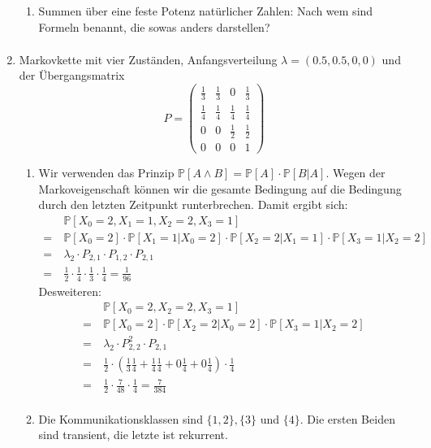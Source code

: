 \documentclass[a4paper,11pt,notitlepage,fullpage]{article}
\newcommand{\pp}[1]{\mathbb P\left[#1\right]}
\begin{document}
\begin{enumerate}
\begin{enumerate}
\item Summen über eine feste Potenz natürlicher Zahlen: Nach wem sind Formeln benannt, die sowas anders darstellen?
\begin{align*}
\end{align*}
\end{enumerate}

\item Markovkette mit vier Zuständen, Anfangsverteilung $\lambda = (0.5, 0.5, 0, 0)$ und der Übergangsmatrix
$$P=\begin{pmatrix}
\frac{1}{3} & \frac{1}{3} & 0 & \frac{1}{3} \\
\frac{1}{4} & \frac{1}{4} & \frac{1}{4} & \frac{1}{4} \\
0 & 0 & \frac{1}{2} & \frac{1}{2} \\
0 & 0 & 0 & 1
\end{pmatrix}$$
\begin{enumerate}
\item Wir verwenden das Prinzip $\pp{A \wedge B} = \pp{A} \cdot \pp{B|A}$. Wegen der Markoveigenschaft können wir die gesamte Bedingung auf die Bedingung durch den letzten Zeitpunkt runterbrechen. Damit ergibt sich:
\begin{align*}
&\pp{X_0 = 2, X_1 = 1, X_2 = 2, X_3 = 1} \\
=~&\pp{X_0 = 2} \cdot \pp{X_1 = 1 | X_0 = 2} \cdot \pp{X_2 = 2 | X_1 = 1} \cdot \pp{X_3 = 1 | X_2 = 2} \\
=~&\lambda_2 \cdot P_{2, 1} \cdot P_{1, 2} \cdot P_{2, 1} \\
=~&\frac{1}{2} \cdot \frac{1}{4} \cdot \frac{1}{3} \cdot \frac{1}{4} = \frac{1}{96}
\end{align*}
Desweiteren:
\begin{align*}
&\pp{X_0 = 2, X_2 = 2, X_3 = 1} \\
=~&\pp{X_0 = 2} \cdot \pp{X_2 = 2 | X_0 = 2} \cdot \pp{X_3 = 1 | X_2 = 2} \\
=~&\lambda_2 \cdot P^2_{2, 2} \cdot P_{2, 1} \\
=~&\frac{1}{2} \cdot (\frac{1}{3}\frac{1}{4} + \frac{1}{4}\frac{1}{4} + 0 \frac{1}{4}+ 0 \frac{1}{4}) \cdot \frac{1}{4} \\
=~&\frac{1}{2} \cdot \frac{7}{48} \cdot \frac{1}{4}  = \frac{7}{384}\\
\end{align*}

\item Die Kommunikationsklassen sind $\{1, 2\}, \{3\}$ und $\{4\}$. Die ersten Beiden sind transient, die letzte ist rekurrent.


\end{enumerate}
\end{enumerate}
\end{document}
